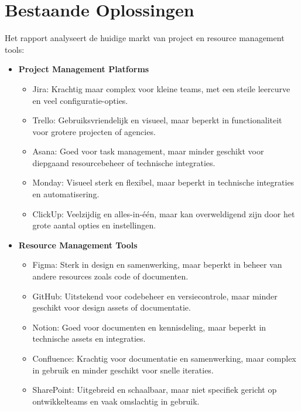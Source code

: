 \section{Bestaande Oplossingen}
\label{sec:bestaande-oplossingen}

Het \textcite{GitLab2023} rapport analyseert de huidige markt van project en resource management tools:

\begin{itemize}
    \item \textbf{Project Management Platforms}
    \begin{itemize}
        \item Jira: Krachtig maar complex voor kleine teams, met een steile leercurve en veel configuratie-opties.
        \item Trello: Gebruiksvriendelijk en visueel, maar beperkt in functionaliteit voor grotere projecten of agencies.
        \item Asana: Goed voor task management, maar minder geschikt voor diepgaand resourcebeheer of technische integraties.
        \item Monday: Visueel sterk en flexibel, maar beperkt in technische integraties en automatisering.
        \item ClickUp: Veelzijdig en alles-in-één, maar kan overweldigend zijn door het grote aantal opties en instellingen.
    \end{itemize}
    
    \item \textbf{Resource Management Tools}
    \begin{itemize}
        \item Figma: Sterk in design en samenwerking, maar beperkt in beheer van andere resources zoals code of documenten.
        \item GitHub: Uitstekend voor codebeheer en versiecontrole, maar minder geschikt voor design assets of documentatie.
        \item Notion: Goed voor documenten en kennisdeling, maar beperkt in technische assets en integraties.
        \item Confluence: Krachtig voor documentatie en samenwerking, maar complex in gebruik en minder geschikt voor snelle iteraties.
        \item SharePoint: Uitgebreid en schaalbaar, maar niet specifiek gericht op ontwikkelteams en vaak omslachtig in gebruik.
    \end{itemize}
\end{itemize}

